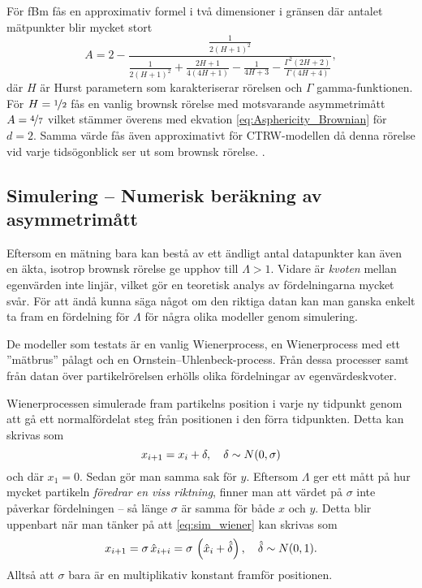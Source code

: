 För fBm fås en approximativ formel i två dimensioner i gränsen där antalet mätpunkter blir mycket stort ~\cite{Hong_asymmetri1998}
\begin{equation} \label{eq:A_fBm}
A=2-\frac{\frac{1}{2(H+1)^2}}{\frac{1}{2(H+1)^2}+\frac{2H+1}{4(4H+1)}-\frac{1}{4H+3}-\frac{\Gamma^2(2H+2)}{\Gamma(4H+4)}},
\end{equation}
där $H$ är Hurst parametern som karakteriserar rörelsen och $\Gamma$ gamma-funktionen. För $H=\nicefrac{1}{2}$ fås en vanlig brownsk rörelse med motsvarande  asymmetrimått $A=\nicefrac{4}{7}$ vilket stämmer överens med ekvation \eqref{eq:Asphericity_Brownian} för $d=2$. Samma värde fås även approximativt för CTRW-modellen \cite{Ernst_ACTRW2012} då denna rörelse vid varje tidsögonblick ser ut som brownsk rörelse. .


\subsection{Simulering -- Numerisk beräkning av asymmetrimått} %
Eftersom en mätning bara kan bestå av ett ändligt antal datapunkter kan även en äkta, isotrop brownsk rörelse ge upphov till $\varLambda>1$. Vidare är \emph{kvoten} mellan egenvärden inte linjär, vilket gör en teoretisk analys av fördelningarna mycket svår. För att ändå kunna säga något om den riktiga datan kan man ganska enkelt ta fram en fördelning för $\varLambda$ för några olika modeller genom simulering. 

De modeller som testats är en vanlig Wienerprocess, en Wienerprocess med ett ''mätbrus'' pålagt och en Ornstein–Uhlenbeck-process. Från dessa processer samt från datan över partikelrörelsen erhölls olika fördelningar av egenvärdeskvoter. 

Wienerprocessen simulerade fram partikelns position i varje ny tidpunkt genom att gå ett normalfördelat steg från positionen i den förra tidpunkten. Detta kan skrivas som
\begin{equation}\label{eq:sim_wiener}
x_{i+1} = x_i + \delta 
\qcomma  \delta \sim N(0, \sigma)
\end{equation}
och där $x_1=0$. Sedan gör man samma sak för $y$. Eftersom $\varLambda$ ger ett mått på hur mycket partikeln \emph{föredrar en viss riktning}, finner man att värdet på $\sigma$ inte påverkar fördelningen -- så länge $\sigma$ är samma för både $x$ och $y$. Detta blir uppenbart när man tänker på att \eqref{eq:sim_wiener} kan skrivas som 
\begin{equation}
x_{i+1} =\sigma\,\hat{x}_{i+i} = \sigma\,\left( \hat{x}_i + \hat{\delta} \right) 
\qcomma  \hat{\delta} \sim N(0, 1).
\end{equation}
Alltså att $\sigma$ bara är en multiplikativ konstant framför positionen.

